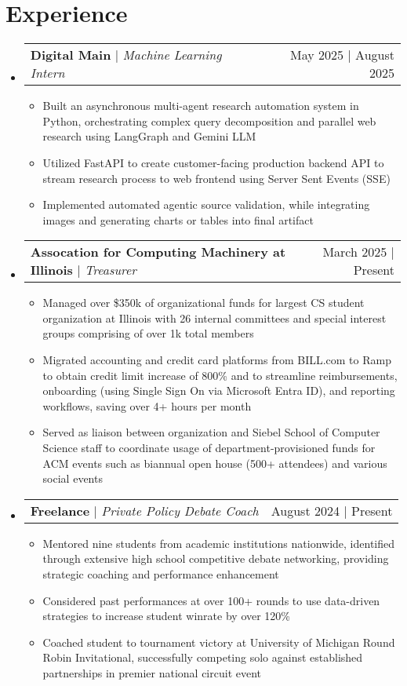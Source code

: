 \documentclass{article}
\makeatletter
\newcommand{\resumeItem}[1]{
  \item\small{
    {#1 \vspace{-2pt}}
  }
}
\newcommand{\resumeProjectHeading}[2]{
    \item
    \begin{tabular*}{0.97\textwidth}{l@{\extracolsep{\fill}}r}
      \small#1 & #2 \\
    \end{tabular*}\vspace{-7pt}
}
\newcommand{\resumeSubHeadingListStart}{\begin{itemize}[leftmargin=0.15in, label={}]}
\newcommand{\resumeSubHeadingListEnd}{\end{itemize}}
\newcommand{\resumeItemListStart}{\begin{itemize}}
\newcommand{\resumeItemListEnd}{\end{itemize}\vspace{-5pt}}
\makeatother
\begin{document}
\section{Experience}
\resumeSubHeadingListStart
\resumeProjectHeading
{\textbf{Digital Main} $|$ {\footnotesize\emph{Machine Learning Intern}}}{May 2025 | August 2025}
\resumeItemListStart
\resumeItem{Built an asynchronous multi-agent research automation system in Python, orchestrating complex query decomposition and parallel web research using LangGraph and Gemini LLM}
\resumeItem{Utilized FastAPI to create customer-facing production backend API to stream research process to web frontend using Server Sent Events (SSE)}
\resumeItem{Implemented automated agentic source validation, while integrating images and generating charts or tables into final artifact}
\resumeItemListEnd
\resumeProjectHeading {\textbf{Assocation for Computing Machinery at Illinois} $|$ {\footnotesize\emph{Treasurer}}}{March 2025 | Present}
\resumeItemListStart
\resumeItem{Managed over \$350k of organizational funds for largest CS student organization at Illinois with 26 internal committees and special interest groups comprising of over 1k total members}
\resumeItem{Migrated accounting and credit card platforms from BILL.com to Ramp to obtain credit limit increase of 800\% and to streamline reimbursements, onboarding (using Single Sign On via Microsoft Entra ID), and reporting workflows, saving over 4+ hours per month} 
\resumeItem{Served as liaison between organization and Siebel School of Computer Science staff to coordinate usage of department-provisioned funds for ACM events such as biannual open house (500+ attendees) and various social events}
\resumeItemListEnd

\resumeProjectHeading
{\textbf{Freelance} $|$ {\footnotesize\emph{Private Policy Debate Coach}}}{August 2024 | Present}
\resumeItemListStart
\resumeItem{Mentored nine students from academic institutions nationwide, identified through extensive high school competitive debate networking, providing strategic coaching and performance enhancement}
\resumeItem{Considered past performances at over 100+ rounds to use data-driven strategies to increase student winrate by over 120\%}
\resumeItem{Coached student to tournament victory at University of Michigan Round Robin Invitational, successfully competing solo against established partnerships in premier national circuit event}
\resumeItemListEnd
\resumeSubHeadingListEnd

\vspace{-10pt}
\end{document}
